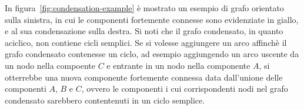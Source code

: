 In figura~\ref{fig:condensation-example} \`e mostrato un esempio di grafo orientato sulla sinistra, in cui le componenti
fortemente connesse sono evidenziate in giallo, e al sua condensazione sulla destra. \newline
Si noti che il grafo condensato, in quanto aciclico, non contiene cicli semplici.
Se si volesse aggiungere un arco affinch\`e il grafo condensato contenesse un ciclo, ad esempio aggiungendo un arco
uscente da un nodo nella compoente $C$ e entrante in un nodo nella componente $A$, si otterrebbe una nuova componente
fortemente connessa data dall'unione delle componenti $A$, $B$ e $C$, ovvero le componenti i cui corrispondenti nodi
nel grafo condensato sarebbero contentenuti in un ciclo semplice. \newline






